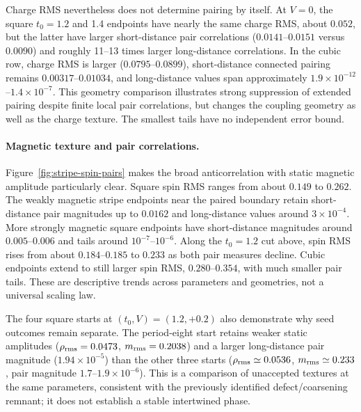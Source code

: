 \documentclass[11pt,letterpaper]{article}
\begin{document}
Charge RMS nevertheless does not determine pairing by itself. At $V=0$,
the square $t_0=1.2$ and 1.4 endpoints have nearly the same charge RMS,
about $0.052$, but the latter have larger short-distance pair correlations
($0.0141$--$0.0151$ versus $0.0090$) and roughly 11--13 times larger
long-distance correlations. In the cubic row, charge RMS is larger
($0.0795$--$0.0899$), short-distance connected pairing remains
$0.00317$--$0.01034$, and long-distance values span approximately
$1.9\times10^{-12}$--$1.4\times10^{-7}$. This geometry comparison
illustrates strong suppression of extended pairing despite finite local
pair correlations, but changes the coupling geometry as well as the
charge texture. The smallest tails have no independent error bound.

\paragraph{Magnetic texture and pair correlations.}
Figure~\ref{fig:stripe-spin-pairs} makes the broad anticorrelation with
static magnetic amplitude particularly clear. Square spin RMS ranges
from about $0.149$ to $0.262$. The weakly magnetic stripe endpoints near
the paired boundary retain short-distance pair magnitudes up to $0.0162$
and long-distance values around $3\times10^{-4}$. More strongly magnetic
square endpoints have short-distance magnitudes around $0.005$--$0.006$
and tails around $10^{-7}$--$10^{-6}$. Along the $t_0=1.2$ cut above,
spin RMS rises from about $0.184$--$0.185$ to $0.233$ as both pair
measures decline. Cubic endpoints extend to still larger spin RMS,
$0.280$--$0.354$, with much smaller pair tails. These are descriptive
trends across parameters and geometries, not a universal scaling law.

The four square starts at $(t_0,V)=(1.2,+0.2)$ also demonstrate why seed
outcomes remain separate. The period-eight start retains weaker static
amplitudes ($\rho_{\rm rms}=0.0473$, $m_{\rm rms}=0.2038$) and a larger
long-distance pair magnitude ($1.94\times10^{-5}$) than the other three
starts ($\rho_{\rm rms}\simeq0.0536$, $m_{\rm rms}\simeq0.233$,
pair magnitude $1.7$--$1.9\times10^{-6}$). This is a comparison of
unaccepted textures at the same parameters, consistent with the previously
identified defect/coarsening remnant; it does not establish a stable
intertwined phase.
\end{document}
